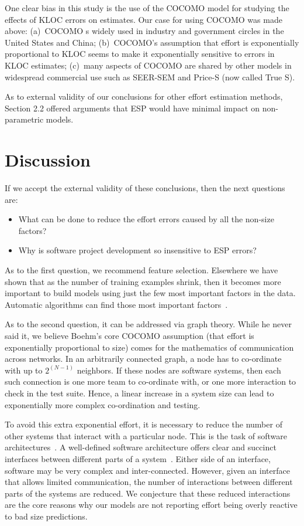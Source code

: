 \documentclass[final,twocolumn]{elsarticle}
\newcommand{\bi}{\begin{itemize}[leftmargin=0.4cm]}
\newcommand{\ei}{\end{itemize}}
\theoremstyle{break}
\begin{document}
One clear bias in this study is the use of the COCOMO model for studying the effects
of KLOC errors on estimates. Our case for using COCOMO was made above:
(a)~COCOMO s widely used in industry and government circles in the United States and China;
(b)~COCOMO's assumption that effort is exponentially proportional to KLOC seems to make it
exponentially sensitive to errors in KLOC estimates;
(c)~many aspects of COCOMO
 are shared by other models in widespread commercial
 use such as  SEER-SEM and Price-S (now called True S).

 As to external validity of our conclusions for  other effort estimation methods, Section 2.2
 offered arguments that ESP would have minimal impact on
 non-parametric models.
  
  
\section{Discussion}
If we accept the external validity of these conclusions, then the
next questions are:
\bi

\item
  What can be done to reduce the effort errors caused by all the non-size factors?
\item
  Why is
  software project development so insensitive to ESP errors?
  \ei
   As to the first question, we recommend feature selection. Elsewhere we have shown
  that as the number of training examples shrink, then it becomes more
  important to build models using just the few most important factors in the
  data. Automatic algorithms can find those most important factors~\cite{Chen:05}.
  
  As to the second question, it can be addressed via graph theory. While he
  never said it, we believe Boehm's core COCOMO assumption (that effort is
  exponentially proportional to size) comes for the mathematics of communication
  across networks. In an arbitrarily connected graph, a node has to
  co-ordinate with up to $2^{(N-1)}$ neighbors. If these nodes are software
  systems, then each such connection is one more team to co-ordinate with, or
  one more interaction to check in the test suite. Hence, a linear increase in a
  system size can lead to exponentially more complex co-ordination and testing.

  To avoid this extra exponential effort, it is necessary to reduce the number
  of other systems that interact with a particular node. This is the task of
  software architectures~\cite{Garlan:1994}.  A well-defined software
  architecture offers clear and succinct interfaces between different parts of a
  system~\cite{Parnas:1972}.  Either side of an interface, software may be very
  complex and inter-connected. However, given an interface that allows limited
  communication, the number of interactions between different parts of the
  systems are reduced. We conjecture that these reduced interactions are the core reasons
  why our models are not reporting effort being overly reactive to bad size predictions.
\end{document}
